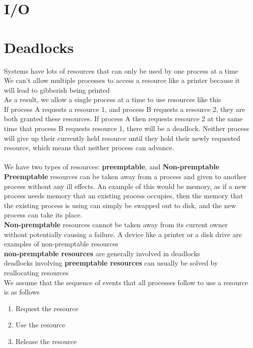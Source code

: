 \documentclass{article}
\begin{document}
\section{I/O}

\section{Deadlocks}
Systems have lots of resources that can only be used by one process at a time
\\We can't allow multiple processes to access a resource like a printer because it will lead to gibberish being printed
\\As a result, we allow a single process at a time to use resources like this
\\If process A requests a resource 1, and process B requests a resource 2, they are both granted these resources. If process A then requests resource 2 at the same time that process B requests resource 1, there will be a deadlock. Neither process will give up their currently held resource until they hold their newly requested resource, which means that neither process can advance.
\\
\\We have two types of resources: \textbf{preemptable}, and \textbf{Non-premptable}
\\\textbf{Preemptable} resources can be taken away from a process and given to another process without any ill effects. An example of this would be memory, as if a new process needs memory that an existing process occupies, then the memory that the existing process is using can simply be swapped out to disk, and the new process can take its place.
\\\textbf{Non-premptable} resources cannot be taken away from its current owner without potentially causing a failure. A device like a printer or a disk drive are examples of non-premptable resources
\\\textbf{non-premptable resources} are generally involved in deadlocks
\\deadlocks involving \textbf{preemptable resources} can usually be solved by reallocating resources
\\We assume that the sequence of events that all processes follow to use a resource is as follows
\begin{enumerate}
	\item Request the resource
	\item Use the resource
	\item Release the resource
\end{enumerate}
\end{document}
